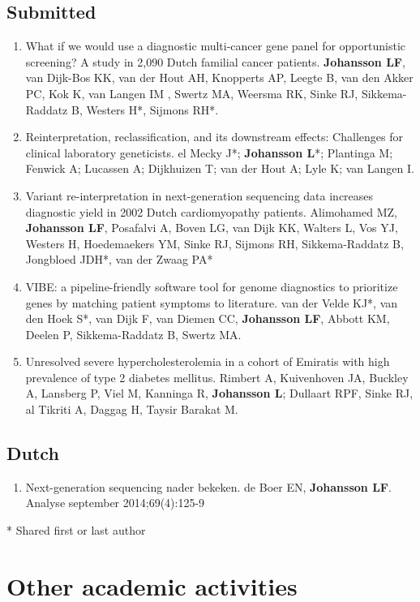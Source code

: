 \begin{appendices}
\section{Submitted}
\begin{enumerate}
\item What if we would use a diagnostic multi-cancer gene panel for opportunistic screening? A study in 2,090 Dutch familial cancer patients.  \textbf{Johansson LF}, van Dijk-Bos KK, van der Hout AH, Knopperts AP, Leegte B, van den Akker PC, Kok K, van Langen IM , Swertz MA, Weersma RK, Sinke RJ, Sikkema-Raddatz B, Westers H*,  Sijmons RH*.
\item Reinterpretation, reclassification, and its downstream effects: Challenges for clinical laboratory geneticists. el Mecky J*; \textbf{Johansson L}*; Plantinga M; Fenwick A; Lucassen A; Dijkhuizen T; van der Hout A; Lyle K; van Langen I.
\item Variant re-interpretation in next-generation sequencing data increases diagnostic yield in 2002 Dutch cardiomyopathy patients. Alimohamed MZ, \textbf{Johansson LF}, Posafalvi A, Boven LG, van Dijk KK, Walters L, Vos YJ, Westers H, Hoedemaekers YM, Sinke RJ, Sijmons RH, Sikkema-Raddatz B, Jongbloed JDH*, van der Zwaag PA*
\item VIBE: a pipeline-friendly software tool for genome diagnostics to prioritize genes by matching patient symptoms to literature. van der Velde KJ*, van den Hoek S*, van Dijk F, van Diemen CC, \textbf{Johansson LF}, Abbott KM, Deelen P, Sikkema-Raddatz B, Swertz MA. 
\item Unresolved severe hypercholesterolemia in a cohort of Emiratis with high prevalence of type 2 diabetes mellitus. Rimbert A, Kuivenhoven JA, Buckley A, Lansberg P, Viel M, Kanninga R, \textbf{Johansson L}; Dullaart RPF, Sinke RJ, al Tikriti A, Daggag H, Taysir Barakat M.
\end{enumerate}

\section{Dutch}
\begin{enumerate}
\item Next-generation sequencing nader bekeken. de Boer EN, \textbf{Johansson LF}. Analyse september 2014;69(4):125-9
\end{enumerate}

* Shared first or last author

\chapter{Other academic activities}


\end{appendices}
